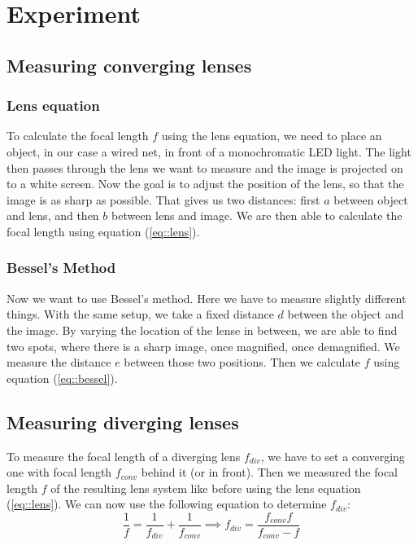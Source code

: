 \section{Experiment}

\subsection{Measuring converging lenses}
\subsubsection{Lens equation}
To calculate the focal length $f$ using the lens equation, we need to place an object, in our case a wired net, in front of a monochromatic LED light. 
The light then passes through the lens we want to measure and the image is projected on to a white screen.
Now the goal is to adjust the position of the lens, so that the image is as sharp as possible.
That gives us two distances:
first $a$ between object and lens, and then $b$ between lens and image.
We are then able to calculate the focal length using equation (\ref{eq::lens}).


\subsubsection{Bessel's Method}
Now we want to use Bessel's method.
Here we have to measure slightly different things.
With the same setup, we take a fixed distance $d$ between the object and the image. 
By varying the location of the lense in between, we are able to find two spots, where there is a sharp image, once magnified, once demagnified.
We measure the distance $e$ between those two positions. Then we calculate $f$ using equation (\ref{eq::bessel}).


\subsection{Measuring diverging lenses}
To measure the focal length of a diverging lens $f_{div}$, we have to set a converging one with focal length $f_{conv}$ behind it (or in front). 
Then we measured the focal length $f$ of the resulting lens system like before using the lens equation (\ref{eq::lens}).
We can now use the following equation to determine $f_{div}$:
\begin{equation}
	\frac{1}{f} = \frac{1}{f_{div}} + \frac{1}{f_{conv}} \implies f_{div} = \frac{f_{conv} f}{f_{conv} - f}
	\label{eq::div}
\end{equation}


